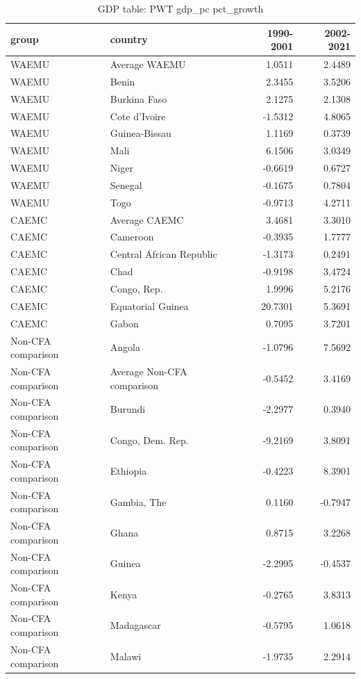 \begin{table}

\caption{GDP table: PWT gdp_pc pct_growth}
\centering
\begin{tabular}[t]{llrr}
\toprule
group & country & 1990-2001 & 2002-2021\\
\midrule
WAEMU & Average WAEMU & 1.0511 & 2.4489\\
WAEMU & Benin & 2.3455 & 3.5206\\
WAEMU & Burkina Faso & 2.1275 & 2.1308\\
WAEMU & Cote d'Ivoire & -1.5312 & 4.8065\\
WAEMU & Guinea-Bissau & 1.1169 & 0.3739\\
\addlinespace
WAEMU & Mali & 6.1506 & 3.0349\\
WAEMU & Niger & -0.6619 & 0.6727\\
WAEMU & Senegal & -0.1675 & 0.7804\\
WAEMU & Togo & -0.9713 & 4.2711\\
CAEMC & Average CAEMC & 3.4681 & 3.3010\\
\addlinespace
CAEMC & Cameroon & -0.3935 & 1.7777\\
CAEMC & Central African Republic & -1.3173 & 0.2491\\
CAEMC & Chad & -0.9198 & 3.4724\\
CAEMC & Congo, Rep. & 1.9996 & 5.2176\\
CAEMC & Equatorial Guinea & 20.7301 & 5.3691\\
\addlinespace
CAEMC & Gabon & 0.7095 & 3.7201\\
Non-CFA comparison & Angola & -1.0796 & 7.5692\\
Non-CFA comparison & Average Non-CFA comparison & -0.5452 & 3.4169\\
Non-CFA comparison & Burundi & -2.2977 & 0.3940\\
Non-CFA comparison & Congo, Dem. Rep. & -9.2169 & 3.8091\\
\addlinespace
Non-CFA comparison & Ethiopia & -0.4223 & 8.3901\\
Non-CFA comparison & Gambia, The & 0.1160 & -0.7947\\
Non-CFA comparison & Ghana & 0.8715 & 3.2268\\
Non-CFA comparison & Guinea & -2.2995 & -0.4537\\
Non-CFA comparison & Kenya & -0.2765 & 3.8313\\
\addlinespace
Non-CFA comparison & Madagascar & -0.5795 & 1.0618\\
Non-CFA comparison & Malawi & -1.9735 & 2.2914\\

\end{tabular}
\end{table}
